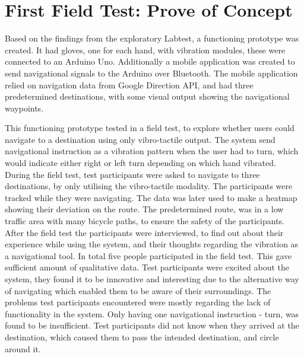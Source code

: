 \documentclass{sigchi}
\begin{document}
\section{First Field Test: Prove of Concept}
Based on the findings from the exploratory Labtest, a functioning prototype was created. It had gloves, one for each hand, with vibration modules, these were connected to an Arduino Uno. Additionally a mobile application was created to send navigational signals to the Arduino over Bluetooth. The mobile application relied on navigation data from Google Direction API, and had three predetermined destinations, with some visual output showing the navigational waypoints. 

This functioning prototype tested in a field test, to explore whether users could navigate to a destination using only vibro-tactile output. The system send navigational instruction as a vibration pattern when the user had to turn, which would indicate either right or left turn depending on which hand vibrated. 
\newline
\newline 
During the field test, test participants were asked to navigate to three destinations, by only utilising the vibro-tactile modality. The participants were tracked while they were navigating. The data was later used to make a heatmap showing their deviation on the route. The predetermined route, was in a low traffic area with many bicycle paths, to ensure the safety of the participants. 
\newline
\newline 
After the field test the participants were interviewed, to find out about their experience while using the system, and their thoughts regarding the vibration as a navigational tool. 
\newline
\newline  
In total five people participated in the field test. This gave sufficient amount of qualitative data. Test participants were excited about the system, they found it to be innovative and interesting due to the alternative way of navigating which enabled them to be aware of their surroundings.
\newline
\newline  
The problems test participants encountered were mostly regarding the lack of functionality in the system. Only having one navigational instruction - turn, was found to be insufficient. Test participants did not know when they arrived at the destination, which caused them to pass the intended destination, and circle around it.
\end{document}

